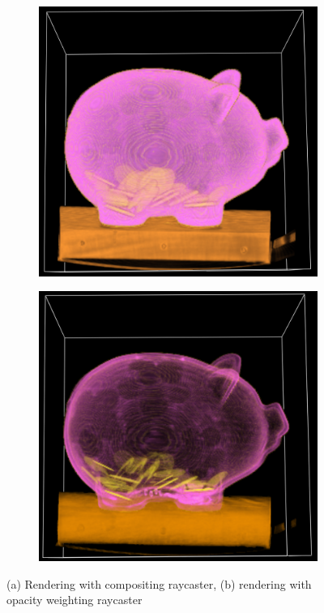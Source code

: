 \begin{figure}[h!]
    \centering
    \captionsetup{justification=centering,margin=0.5cm}
    \begin{subfigure}[t]{0.49\textwidth}
        \includegraphics[width=\textwidth]{img/pig-compositing.png}
        \caption{ }
    \end{subfigure}
    \begin{subfigure}[t]{0.49\textwidth}
        \includegraphics[width=\textwidth]{img/pig-opacity.png}
        \caption{ }
    \end{subfigure}
    \caption{(a) Rendering with compositing raycaster, (b) rendering with opacity weighting raycaster}
    \label{fig:compareopacity}
\end{figure}


